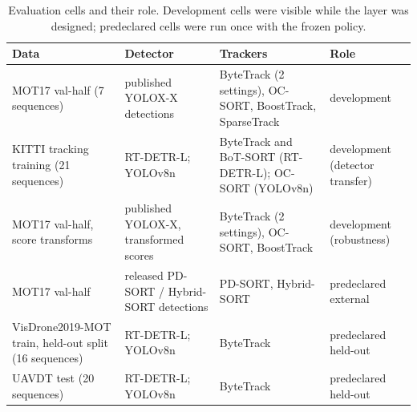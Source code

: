 \begin{table}[t]
\caption{Evaluation cells and their role. Development cells were visible while
the layer was designed; predeclared cells were run once with the frozen
policy.}
\label{tab:data}
\centering\footnotesize
\setlength{\tabcolsep}{4pt}
\begin{tabular}{@{}>{\raggedright\arraybackslash}p{29mm}>{\raggedright\arraybackslash}p{25mm}>{\raggedright\arraybackslash}p{42mm}>{\raggedright\arraybackslash}p{25mm}@{}}
\toprule
Data & Detector & Trackers & Role\\
\midrule
MOT17 val-half (7 sequences) & published YOLOX-X detections & ByteTrack (2 settings), OC-SORT, BoostTrack, SparseTrack & development\\
KITTI tracking training (21 sequences) & RT-DETR-L; YOLOv8n & ByteTrack and BoT-SORT (RT-DETR-L); OC-SORT (YOLOv8n) & development (detector transfer)\\
MOT17 val-half, score transforms & published YOLOX-X, transformed scores & ByteTrack (2 settings), OC-SORT, BoostTrack & development (robustness)\\
MOT17 val-half & released PD-SORT / Hybrid-SORT detections & PD-SORT, Hybrid-SORT & predeclared external\\
VisDrone2019-MOT train, held-out split (16 sequences) & RT-DETR-L; YOLOv8n & ByteTrack & predeclared held-out\\
UAVDT test (20 sequences) & RT-DETR-L; YOLOv8n & ByteTrack & predeclared held-out\\
\bottomrule
\end{tabular}
\end{table}
